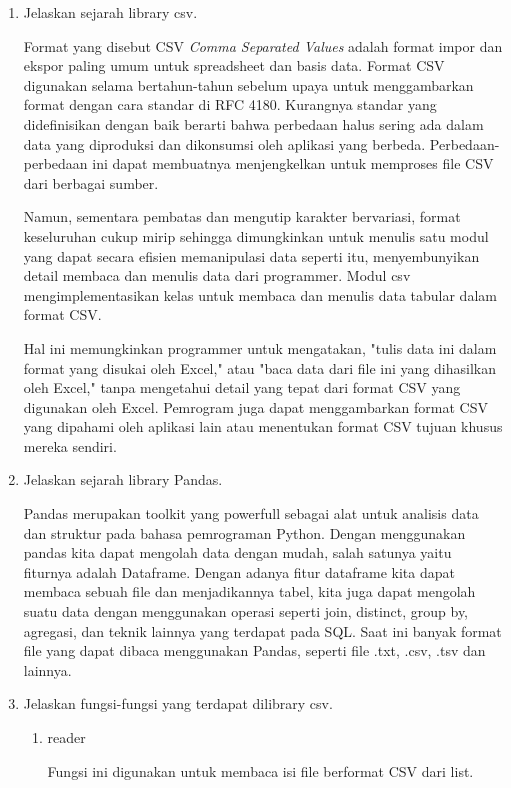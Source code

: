\begin{enumerate}
   \item Jelaskan sejarah library csv.

   Format yang disebut CSV \textit{Comma Separated Values} adalah format impor dan ekspor paling umum untuk spreadsheet dan basis data. Format CSV digunakan selama bertahun-tahun sebelum upaya untuk menggambarkan format dengan cara standar di RFC 4180. Kurangnya standar yang didefinisikan dengan baik berarti bahwa perbedaan halus sering ada dalam data yang diproduksi dan dikonsumsi oleh aplikasi yang berbeda. Perbedaan-perbedaan ini dapat membuatnya menjengkelkan untuk memproses file CSV dari berbagai sumber.

   Namun, sementara pembatas dan mengutip karakter bervariasi, format keseluruhan cukup mirip sehingga dimungkinkan untuk menulis satu modul yang dapat secara efisien memanipulasi data seperti itu, menyembunyikan detail membaca dan menulis data dari programmer. Modul csv mengimplementasikan kelas untuk membaca dan menulis data tabular dalam format CSV.

   Hal ini memungkinkan programmer untuk mengatakan, "tulis data ini dalam format yang disukai oleh Excel," atau "baca data dari file ini yang dihasilkan oleh Excel," tanpa mengetahui detail yang tepat dari format CSV yang digunakan oleh Excel. Pemrogram juga dapat menggambarkan format CSV yang dipahami oleh aplikasi lain atau menentukan format CSV tujuan khusus mereka sendiri.

   \item Jelaskan sejarah library Pandas.
   
   Pandas merupakan toolkit yang powerfull sebagai alat untuk analisis data dan struktur pada bahasa pemrograman Python. Dengan menggunakan pandas kita dapat mengolah data dengan mudah, salah satunya yaitu fiturnya adalah Dataframe. Dengan adanya fitur dataframe kita dapat membaca sebuah file dan menjadikannya tabel, kita juga dapat mengolah suatu data dengan menggunakan operasi seperti join, distinct, group by, agregasi, dan teknik lainnya yang terdapat pada SQL. Saat ini banyak format file yang dapat dibaca menggunakan Pandas, seperti file .txt, .csv, .tsv dan lainnya.

   \item Jelaskan fungsi-fungsi yang terdapat dilibrary csv.

       \begin{enumerate}
		\item reader
		
		Fungsi ini digunakan untuk membaca isi file berformat CSV dari list.
		

\end{enumerate}
\end{enumerate}
